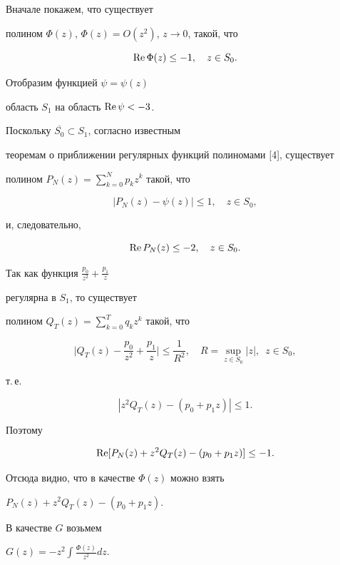 \begin{pf} Вначале покажем, что существует


полином $\Phi(z)$, $\Phi(z)=O(z^2)$, $z \to 0$, такой, что


$$


\re \Phi(z) \leq -1,\quad z \in S_0.


$$


Отобразим функцией $\psi = \psi(z)$


область $S_1$ на область $\operatorname{Re}\psi < -3$.


Поскольку $\overline{S_0} \subset S_1$, согласно известным


теоремам о приближении регулярных функций полиномами [4], существует


полином $P_N(z)= \sum\limits_{k=0}^{N}p_k z^k$ такой, что


$$


|P_N(z)-\psi(z)| \leq 1,\quad z \in S_0,


$$


и, следовательно,


$$


\re P_N(z) \leq -2,\quad z \in S_0.


$$


Так как функция $ \frac{p_0}{z^2}+\frac{p_1}{z}$


регулярна в $S_1$, то существует


полином $Q_T(z) = \sum\limits_{k=0}^{T}q_k z^k$ такой, что


$$


\bigg|Q_T(z)-


\frac{p_0}{z^2}+\frac{p_1}{z}


\bigg| \leq \frac{1}{R^2},\quad R= \sup_{z \in S_0}|z|,\; \ z \in S_0,


$$


т.\,е.


$$


|z^2 Q_T(z) - (p_0+p_1 z)| \leq 1.


$$


Поэтому


$$


\re[


P_N(z)+z^2 Q_T(z) - (p_0+p_1 z)] \leq -1.


$$


Отсюда видно, что в качестве $\Phi(z)$ можно взять


$P_N(z)+z^2 Q_T(z) - (p_0+p_1 z)$.





В качестве $G$  возьмем


$G(z)= -z^2 \int \frac{\Phi(z)}{z^2} dz$.


\end{pf}





